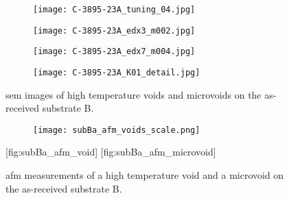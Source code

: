 \begin{figure}[htbp]
    \centering
    \begin{subfigure}[t]{\textwidth}
    \caption{}\label{fig:subBa_high-temperature-voids}
          \begin{minipage}[t]{0.49\linewidth}
            \centering
            \texttt{[image: C-3895-23A\_tuning\_04.jpg]}
          \end{minipage}
          \hfill
          \begin{minipage}[t]{0.49\linewidth}
            \centering
            \texttt{[image: C-3895-23A\_edx3\_m002.jpg]}
          \end{minipage}
    \end{subfigure}%
    \par\bigskip
    \begin{subfigure}[t]{\textwidth}
    \caption{}\label{fig:subBa_microvoids}
          \begin{minipage}[t]{0.49\linewidth}
            \centering
            \texttt{[image: C-3895-23A\_edx7\_m004.jpg]}
          \end{minipage}
          \hfill
          \begin{minipage}[t]{0.49\linewidth}
            \centering
            \texttt{[image: C-3895-23A\_K01\_detail.jpg]}
          \end{minipage}
    \end{subfigure}%
    \caption[\Ac{sem} images of voids on substrate B.]{\Ac{sem} images of  high temperature voids and  microvoids on the as-received substrate B.}
    \label{fig:SEM_C389523_voids}
\end{figure}

\begin{figure}
    \centering
    \begin{subfigure}[b]{0.032\linewidth}
        \label{fig:subBa_afm_voids_scale}\captionsetup{list=no}
        \texttt{[image: subBa\_afm\_voids\_scale.png]}
    \end{subfigure}
    \hfill
    [fig:subBa_afm_void]
    \hfill
    [fig:subBa_afm_microvoid]
    \caption[\Ac{afm} measurements of void and microvoid on as-received substrate B.]{\Ac{afm} measurements of  a high temperature void and  a microvoid on the as-received substrate B.}
    \label{fig:subBa_afm_voids}
\end{figure}

